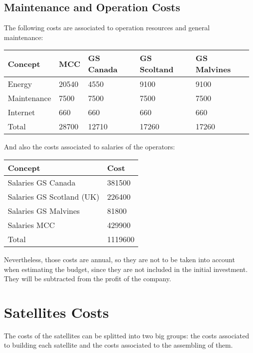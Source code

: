 \subsection{Maintenance and Operation Costs}
The following costs are associated to operation resources and general maintenance:

\begin{center}
\begin{tabular}{ | l | l | l | l | l | }
\toprule
\hline
\rowcolor[gray]{0.75}
	Concept & MCC & GS Canada & GS Scoltand & GS Malvines \\ \hline
	Energy & 20540 & 4550 & 9100 & 9100 \\ \hline
	Maintenance & 7500 & 7500 & 7500 & 7500 \\ \hline
	Internet & 660 & 660 & 660 & 660 \\ \hline
	\rowcolor[gray]{0.65}
	Total & 28700 & 12710 & 17260 & 17260 \\ \hline
	\bottomrule
\end{tabular}
\end{center}

And also the costs associated to salaries of the operators:

\begin{center}
\begin{tabular}{ | l | l | }
\toprule
\hline
	\rowcolor[gray]{0.75}
	Concept & Cost \\ \hline
	Salaries GS Canada & 381500 \\ \hline
	Salaries GS Scotland (UK) & 226400 \\ \hline
	Salaries GS Malvines & 81800 \\ \hline
	Salaries MCC & 429900 \\ \hline
	\rowcolor[gray]{0.65}
	Total & 1119600 \\ \hline
	\bottomrule
\end{tabular}
\end{center}

Nevertheless, those costs are annual, so they are not to be taken into account when estimating the budget, since they are not included in the initial investment. They will be subtracted from the profit of the company. 

\section{Satellites Costs}
The costs of the satellites can be splitted into two big groups: the costs associated to building each satellite and the costs associated to the assembling of them.

